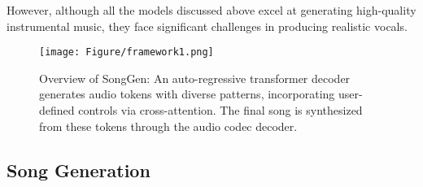 However, although all the models discussed above excel at generating high-quality instrumental music, they face significant challenges in producing realistic vocals.



\begin{figure*}[tb!]
	\centering
	\texttt{[image: Figure/framework1.png]}
    \vspace{-10pt}
	\caption{Overview of SongGen: An auto-regressive transformer decoder generates audio tokens with diverse patterns, incorporating user-defined controls via cross-attention. The final song is synthesized from these tokens through the audio codec decoder.
    }
	\label{fig:framework}
    \vspace{-10pt}
\end{figure*}


\subsection{Song Generation}

